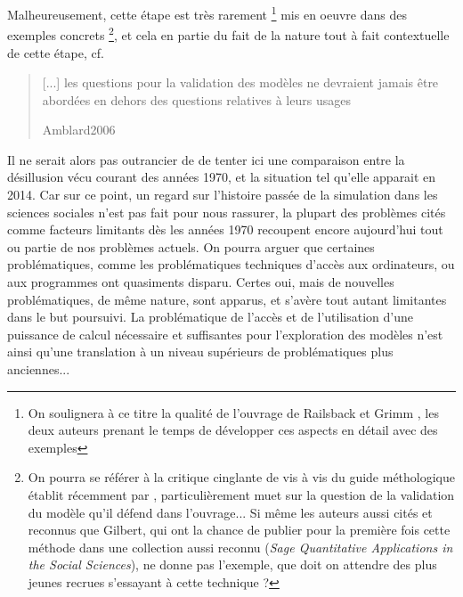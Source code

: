 {Malheureusement, cette étape est très rarement \footnote{On soulignera à ce titre la qualité de l'ouvrage de Railsback et Grimm \autocite{Railsback2012}, les deux auteurs prenant le temps de développer ces aspects en détail avec des exemples} mis en oeuvre dans des exemples concrets \footnote{On pourra se référer à la critique cinglante de \autocite{Manzo2007a} vis à vis du guide méthologique établit récemment par \autocite{Gilbert2008}, particulièrement muet sur la question de la validation du modèle qu'il défend dans l'ouvrage... Si même les auteurs aussi cités et reconnus que Gilbert, qui ont la chance de publier pour la première fois cette méthode dans une collection aussi reconnu (\textit{Sage Quantitative Applications in the Social Sciences}), ne donne pas l'exemple, que doit on attendre des plus jeunes recrues s'essayant à cette technique ?}, et cela en partie du fait de la nature tout à fait contextuelle de cette étape, cf.\blockquote[Amblard2006]{[...] les questions pour  la validation des modèles ne devraient jamais être abordées en dehors des questions relatives à leurs usages}

Il ne serait alors pas outrancier de de tenter ici une comparaison entre la désillusion vécu courant des années 1970, et la situation tel qu'elle apparait en 2014. Car sur ce point, un regard sur l'histoire passée de la simulation dans les sciences sociales n'est pas fait pour nous rassurer, la plupart des problèmes cités comme facteurs limitants dès les années 1970 recoupent encore aujourd'hui tout ou partie de nos problèmes actuels. On pourra arguer que certaines problématiques, comme les problématiques techniques d'accès aux ordinateurs, ou aux programmes ont quasiments disparu. Certes oui, mais de nouvelles problématiques, de même nature, sont apparus, et s'avère tout autant limitantes dans le but poursuivi. La problématique de l'accès et de l'utilisation d'une puissance de calcul nécessaire et suffisantes pour l'exploration des modèles n'est ainsi qu'une translation à un niveau supérieurs de problématiques plus anciennes...


}
